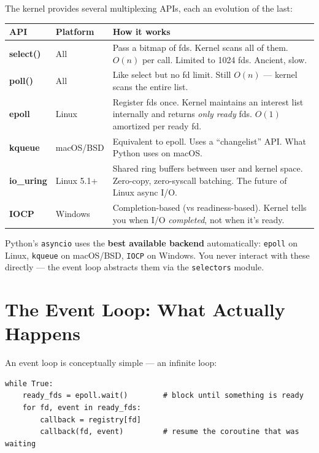 \documentclass[11pt,a4paper,oneside]{book}
\newcommand{\py}[1]{\texttt{\color{pyblue}#1}}
\begin{document}
The kernel provides several multiplexing APIs, each an evolution of the last:

\begin{center}
\renewcommand{\arraystretch}{1.3}
\begin{tcolorbox}[
    colback=codebg,
    colframe=pyblue,
    width=0.98\textwidth,
    arc=3pt,
    boxrule=1pt,
]
\small
\begin{tabularx}{\textwidth}{>{\bfseries\ttfamily}l l X}
\toprule
API & Platform & How it works \\
\midrule
select() & All & Pass a bitmap of fds. Kernel scans all of them. $O(n)$ per call.
           Limited to 1024 fds. Ancient, slow. \\
poll() & All & Like select but no fd limit. Still $O(n)$ --- kernel scans the entire list. \\
epoll & Linux & Register fds once. Kernel maintains an interest list internally and
         returns \emph{only ready} fds. $O(1)$ amortized per ready fd. \\
kqueue & macOS/BSD & Equivalent to epoll. Uses a ``changelist'' API. What Python uses on macOS. \\
io\_uring & Linux 5.1+ & Shared ring buffers between user and kernel space.
           Zero-copy, zero-syscall batching. The future of Linux async I/O. \\
IOCP & Windows & Completion-based (vs readiness-based). Kernel tells you when I/O
       \emph{completed}, not when it's ready. \\
\bottomrule
\end{tabularx}
\end{tcolorbox}
\end{center}

\begin{infobox}
Python's \py{asyncio} uses the \textbf{best available backend} automatically:
\py{epoll} on Linux, \py{kqueue} on macOS/BSD, \py{IOCP} on Windows. You never interact
with these directly --- the event loop abstracts them via the \py{selectors} module.
\end{infobox}

\section{The Event Loop: What Actually Happens}

An event loop is conceptually simple --- an infinite loop:

\begin{lstlisting}[style=python,numbers=none]
while True:
    ready_fds = epoll.wait()        # block until something is ready
    for fd, event in ready_fds:
        callback = registry[fd]
        callback(fd, event)         # resume the coroutine that was waiting
\end{lstlisting}
\end{document}

